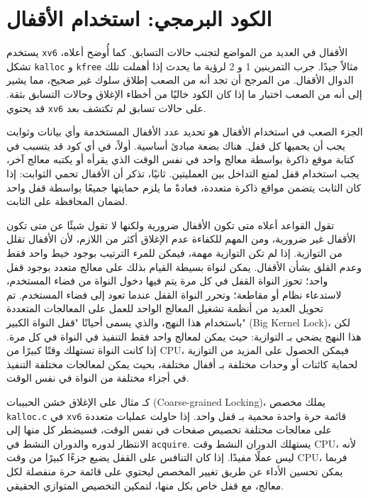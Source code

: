\section{الكود البرمجي: استخدام الأقفال}
\label{sec:code_using_locks}

يستخدم \texttt{xv6} الأقفال في العديد من المواضع لتجنب حالات التسابق.
كما أُوضح أعلاه، تشكل \lstinline{kalloc} و \lstinline{kfree} مثالاً جيدًا.
جرب التمرينين 1 و 2 لرؤية ما يحدث إذا أهملت تلك الدوال الأقفال.
من المرجح أن تجد أنه من الصعب إطلاق سلوك غير صحيح، مما يشير إلى أنه من الصعب اختبار ما إذا كان الكود خاليًا من أخطاء الإغلاق وحالات التسابق بثقة.
قد يحتوي \texttt{xv6} على حالات تسابق لم تكتشف بعد.

الجزء الصعب في استخدام الأقفال هو تحديد عدد الأقفال المستخدمة وأي بيانات وثوابت يجب أن يحميها كل قفل.
هناك بضعة مبادئ أساسية.
أولاً، في أي كود قد يتسبب في كتابة موقع ذاكرة بواسطة معالج واحد في نفس الوقت الذي يقرأه أو يكتبه معالج آخر،
يجب استخدام قفل لمنع التداخل بين العمليتين.
ثانيًا، تذكر أن الأقفال تحمي الثوابت: إذا كان الثابت يتضمن مواقع ذاكرة متعددة،
فعادةً ما يلزم حمايتها جميعًا بواسطة قفل واحد لضمان المحافظة على الثابت.

تقول القواعد أعلاه متى تكون الأقفال ضرورية ولكنها لا تقول شيئًا عن متى تكون الأقفال غير ضرورية، ومن المهم للكفاءة عدم الإغلاق أكثر من اللازم،
لأن الأقفال تقلل من التوازية. إذا لم تكن التوازية مهمة، فيمكن للمرء الترتيب بوجود خيط واحد فقط وعدم القلق بشأن الأقفال.
يمكن لنواة بسيطة القيام بذلك على معالج متعدد بوجود قفل واحد؛
تحوز النواة القفل في كل مرة يتم فيها دخول النواة من فضاء المستخدم، لاستدعاء نظام أو مقاطعة؛
وتحرر النواة القفل عندما تعود إلى فضاء المستخدم.
تم تحويل العديد من أنظمة تشغيل المعالج الواحد للعمل على المعالجات المتعددة باستخدام هذا النهج، والذي يسمى أحيانًا "قفل النواة الكبير" (Big Kernel Lock)،
لكن هذا النهج يضحي بـ التوازية: حيث يمكن لمعالج واحد فقط التنفيذ في النواة في كل مرة.
إذا كانت النواة تستهلك وقتًا كبيرًا من CPU، فيمكن الحصول على المزيد من التوازية لحماية كائنات أو وحدات مختلفة بـ أقفال مختلفة،
بحيث يمكن لمعالجات مختلفة التنفيذ في أجزاء مختلفة من النواة في نفس الوقت.

كـ مثال على الإغلاق خشن الحبيبات (Coarse-grained Locking)، يملك مخصص \texttt{kalloc.c} في \texttt{xv6} قائمة حرة واحدة محمية بـ قفل واحد.
إذا حاولت عمليات متعددة على معالجات مختلفة تخصيص صفحات في نفس الوقت، فسيضطر كل منها إلى الانتظار لدوره والدوران النشط في {\tt acquire}.
يستهلك الدوران النشط وقت CPU، لأنه ليس عملًا مفيدًا.
إذا كان التنافس على القفل يضيع جزءًا كبيرًا من وقت CPU، فربما يمكن تحسين الأداء عن طريق تغيير المخصص ليحتوي على قائمة حرة منفصلة لكل معالج، مع قفل خاص بكل منها، لتمكين التخصيص المتوازي الحقيقي.

